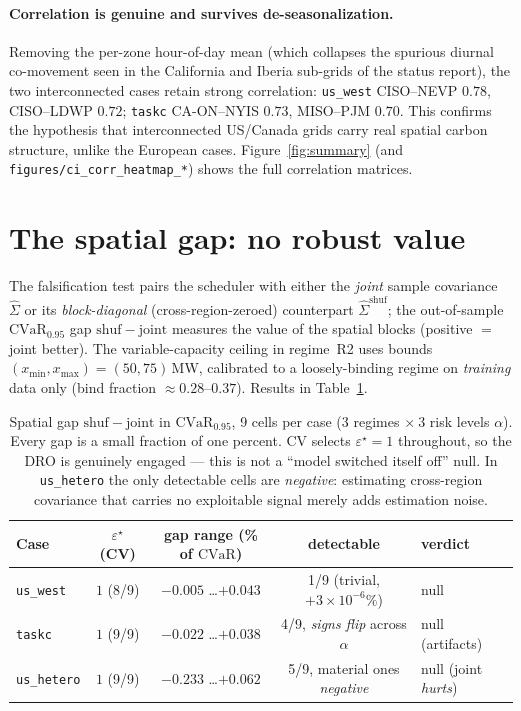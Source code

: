 \documentclass[11pt]{article}
\newcommand{\CVaR}{\mathrm{CVaR}}
\begin{document}
\paragraph{Correlation is genuine and survives de-seasonalization.}
Removing the per-zone hour-of-day mean (which collapses the spurious diurnal
co-movement seen in the California and Iberia sub-grids of the status report), the
two interconnected cases retain strong correlation: \texttt{us\_west}
CISO--NEVP $0.78$, CISO--LDWP $0.72$; \texttt{taskc} CA-ON--NYIS $0.73$,
MISO--PJM $0.70$. This confirms the hypothesis that interconnected US/Canada grids
carry real spatial carbon structure, unlike the European cases.
Figure~\ref{fig:summary} (and \texttt{figures/ci\_corr\_heatmap\_*}) shows the full
correlation matrices.

\section{The spatial gap: no robust value}\label{sec:gap}

The falsification test pairs the scheduler with either the \emph{joint} sample
covariance $\hat\Sigma$ or its \emph{block-diagonal} (cross-region-zeroed)
counterpart $\hat\Sigma^{\mathrm{shuf}}$; the out-of-sample $\CVaR_{0.95}$ gap
$\mathrm{shuf}-\mathrm{joint}$ measures the value of the spatial blocks (positive
$=$ joint better). The variable-capacity ceiling in regime~R2 uses bounds
$(x_{\min},x_{\max})=(50,75)$\,MW, calibrated to a loosely-binding regime on
\emph{training} data only (bind fraction $\approx 0.28$--$0.37$). Results in
Table~\ref{tab:gap}.

\begin{table}[h]\centering\small
\begin{tabular}{@{}lcccl@{}}
\toprule
\textbf{Case} & $\varepsilon^\star$ (CV) & \textbf{gap range (\% of $\CVaR$)} & \textbf{detectable} & \textbf{verdict} \\
\midrule
\texttt{us\_west}   & $1$ (8/9) & $-0.005$ \dots $+0.043$ & 1/9 (trivial, $+3\!\times\!10^{-6}\%$) & null \\
\texttt{taskc}      & $1$ (9/9) & $-0.022$ \dots $+0.038$ & 4/9, \emph{signs flip} across $\alpha$ & null (artifacts) \\
\texttt{us\_hetero} & $1$ (9/9) & $-0.233$ \dots $+0.062$ & 5/9, material ones \emph{negative} & null (joint \emph{hurts}) \\
\bottomrule
\end{tabular}
\caption{Spatial gap $\mathrm{shuf}-\mathrm{joint}$ in $\CVaR_{0.95}$, 9 cells per case
($3$ regimes $\times\ 3$ risk levels $\alpha$). Every gap is a small fraction of one
percent. CV selects $\varepsilon^\star=1$ throughout, so the DRO is genuinely engaged
--- this is not a ``model switched itself off'' null. In \texttt{us\_hetero} the only
detectable cells are \emph{negative}: estimating cross-region covariance that carries
no exploitable signal merely adds estimation noise.}
\label{tab:gap}
\end{table}
\end{document}
